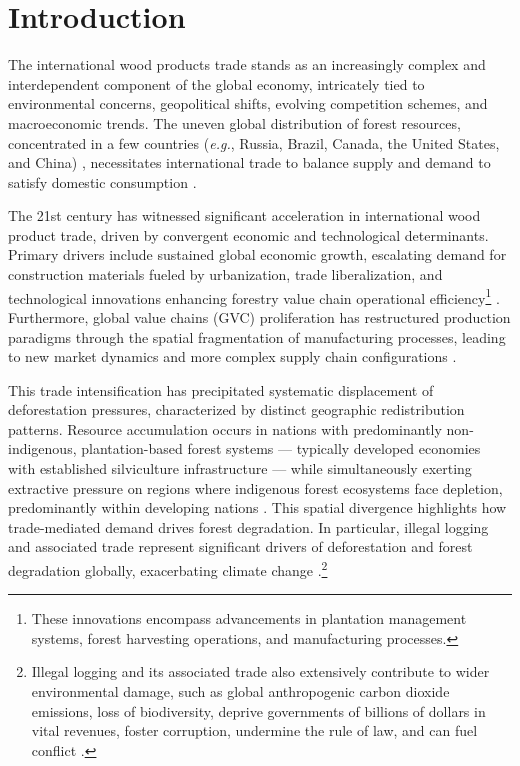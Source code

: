 \documentclass[
  authoryear,
  review,
  3p]{elsarticle}
\begin{document}
\section{Introduction}\label{introduction}

The international wood products trade stands as an increasingly complex
and interdependent component of the global economy, intricately tied to
environmental concerns, geopolitical shifts, evolving competition
schemes, and macroeconomic trends. The uneven global distribution of
forest resources, concentrated in a few countries (\emph{e.g.}, Russia,
Brazil, Canada, the United States, and China) \citep{fao_state_2024},
necessitates international trade to balance supply and demand to satisfy
domestic consumption \citep{long_exploring_2019, huang_static_2024}.

The 21st century has witnessed significant acceleration in international
wood product trade, driven by convergent economic and technological
determinants. Primary drivers include sustained global economic growth,
escalating demand for construction materials fueled by urbanization,
trade liberalization, and technological innovations enhancing forestry
value chain operational efficiency\footnote{These innovations encompass
  advancements in plantation management systems, forest harvesting
  operations, and manufacturing processes.}
\citep{prestemon_international_2003, unecefao_forest_2022-1}.
Furthermore, global value chains (GVC) proliferation has restructured
production paradigms through the spatial fragmentation of manufacturing
processes, leading to new market dynamics and more complex supply chain
configurations \citep{amador_networks_2017}.

This trade intensification has precipitated systematic displacement of
deforestation pressures, characterized by distinct geographic
redistribution patterns. Resource accumulation occurs in nations with
predominantly non-indigenous, plantation-based forest systems ---
typically developed economies with established silviculture
infrastructure --- while simultaneously exerting extractive pressure on
regions where indigenous forest ecosystems face depletion, predominantly
within developing nations
\citep{prestemon_international_2003, leblois_what_2017, pendrill_deforestation_2019, abman_does_2020}.
This spatial divergence highlights how trade-mediated demand drives
forest degradation. In particular, illegal logging and associated trade
represent significant drivers of deforestation and forest degradation
globally, exacerbating climate change
\citep{lawson_illegal_2010}.\footnote{Illegal logging and its associated
  trade also extensively contribute to wider environmental damage, such
  as global anthropogenic carbon dioxide emissions, loss of
  biodiversity, deprive governments of billions of dollars in vital
  revenues, foster corruption, undermine the rule of law, and can fuel
  conflict \citep{lawson_illegal_2010}.}
\end{document}
